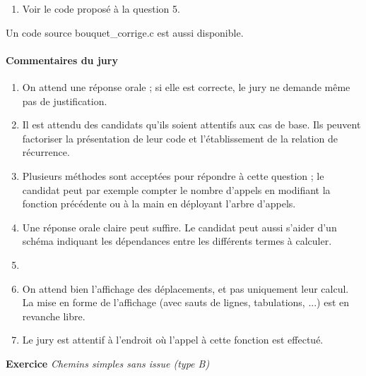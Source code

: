 \documentclass[a4paper, 11pt]{article}
\newenvironment{code-env}
{
  \mdfsetup{
    roundcorner=2pt,
    topline=true,
    leftline=true,
    bottomline=true,
    rightline=true,
    innertopmargin=4pt,
    innerbottommargin=4pt,
    innerrightmargin=4pt,
    innerlinewidth=1pt,
    backgroundcolor={gray!10},
    linecolor={gray!40},
    linewidth=0.1pt,
  }
  \begin{mdframed}[]
  }{\end{mdframed}}
\newenvironment{fancy-code}[1]
  {\VerbatimEnvironment
    \begin{code-env}
    \begin{verbatim}}
 {\end{verbatim}\end{code-env}}
\newcounter{exocntr}
\newcommand{\exocommand}[1]{\stepcounter{exocntr} \textbf{Exercice \arabic{exocntr}} \textit{#1}}
\begin{document}
\begin{enumerate}
    \begin{fancy-code}{c}
void deplacements(int fleurs[m][n], int i, int j){
  if (i == 0 && j == 0) {
       printf("Case A, ");
       return;
  }
  if (i == 0) {
       deplacements(fleurs,0, j - 1);
       printf("Aller à droite, ");
       return;
  }
  if (j == 0) {
       deplacements(fleurs,i - 1, 0);
       printf("Descendre, ");
       return;
  }
  if (fleurs[i - 1][j] > fleurs[i][j - 1]) {
     deplacements(fleurs,i - 1, j);
     printf("Descendre, ");
  }
  else {
     deplacements(fleurs,i, j - 1);
     printf("Aller à droite, ");
  }
}
    \end{fancy-code}
    \item Voir le code proposé à la question 5.
  \end{enumerate}

  Un code source \textsf{bouquet\_corrige.c} est aussi disponible.

\paragraph{Commentaires du jury}

\begin{enumerate}
\item On attend une réponse orale ; si elle est correcte, le jury ne demande même pas de justification.
\item Il est attendu des candidats qu'ils soient attentifs aux cas de base. Ils peuvent factoriser la présentation de leur code et l'établissement de la relation de récurrence.
\item Plusieurs méthodes sont acceptées pour répondre à cette question ; le candidat peut par exemple compter le nombre d'appels en modifiant la fonction précédente ou à la main en déployant l'arbre d'appels.
\item Une réponse orale claire peut suffire. Le candidat peut aussi s'aider d'un schéma indiquant les dépendances entre les différents termes à calculer.
\item
\item On attend bien l'affichage des déplacements, et pas uniquement leur calcul. La mise en forme de l'affichage (avec sauts de lignes, tabulations, ...) est en revanche libre.
\item Le jury est attentif à l'endroit où l'appel à cette fonction est effectué.
\end{enumerate}

\newpage
\exocommand{Chemins simples sans issue (type B)}
\end{document}
